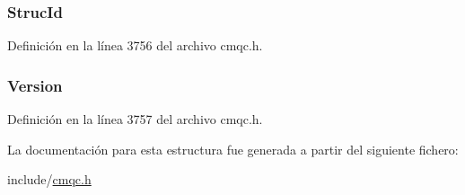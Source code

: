 \hypertarget{structtag_m_q_b_m_h_o_a0530922ca944569b52601d74941f96e4}{}
\subsubsection[{Struc\+Id}]{ Struc\+Id}\label{structtag_m_q_b_m_h_o_a0530922ca944569b52601d74941f96e4}


Definición en la línea 3756 del archivo cmqc.\+h.

\hypertarget{structtag_m_q_b_m_h_o_a0656ef8f766b3907d394d88a35d7b7e9}{}
\subsubsection[{Version}]{ Version}\label{structtag_m_q_b_m_h_o_a0656ef8f766b3907d394d88a35d7b7e9}


Definición en la línea 3757 del archivo cmqc.\+h.



La documentación para esta estructura fue generada a partir del siguiente fichero\+:\begin{DoxyCompactItemize}
\item 
include/\hyperlink{cmqc_8h}{cmqc.\+h}\end{DoxyCompactItemize}

